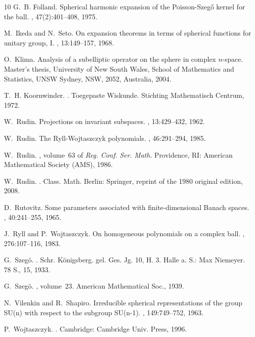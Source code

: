 \documentclass[12pt]{amsart}
\numberwithin{subsection}{section}
\theoremstyle{definition}
\theoremstyle{remark}
\begin{document}
\begin{thebibliography}{10}
G.~B. Folland.
\newblock Spherical harmonic expansion of the {P}oisson-{S}zeg{\H{o}} kernel for the ball.
, 47(2):401--408, 1975.

M.~Ikeda and N.~Seto.
\newblock On expansion theorems in terms of spherical functions for unitary group, {I}.
, 13:149--157, 1968.

O.~Klima.
\newblock Analysis of a subelliptic operator on the sphere in complex $n$-space.
\newblock Master's thesis, University of New South Wales, School of Mathematics and Statistics, UNSW Sydney, NSW, 2052, Australia, 2004.

T.~H. Koornwinder.
.
\newblock Toegepaste Wiskunde. Stichting Mathematisch Centrum, 1972.

W.~Rudin.
\newblock Projections on invariant subspaces.
, 13:429--432, 1962.

W.~Rudin.
\newblock The {Ryll}-{Wojtaszczyk} polynomials.
, 46:291--294, 1985.

W.~Rudin.
, volume~63 of {\em Reg. Conf. Ser. Math.}
\newblock Providence, RI: American Mathematical Society (AMS), 1986.

W.~Rudin.
.
\newblock Class. Math. Berlin: Springer, reprint of the 1980 original edition, 2008.

D.~Rutovitz.
\newblock Some parameters associated with finite-dimensional {Banach} spaces.
, 40:241--255, 1965.

J.~Ryll and P.~Wojtaszczyk.
\newblock On homogeneous polynomials on a complex ball.
, 276:107--116, 1983.

G.~Szeg{\"o}.
.
\newblock Schr. {K{\"o}nigsberg}. gel. {Ges}. {Jg}. 10, {H}. 3. {Halle} a. {S}.: {Max} {Niemeyer}. 78 {S}., 15, 1933.

G.~Szeg\"o.
, volume~23.
\newblock American Mathematical Soc., 1939.

N.~Vilenkin and R.~Shapiro.
\newblock Irreducible spherical representations of the group {SU(n)} with respect to the subgroup {SU(n-1)}.
, 149:749--752, 1963.

P.~Wojtaszczyk.
.
\newblock Cambridge: Cambridge Univ. Press, 1996.

\end{thebibliography}
\end{document}
